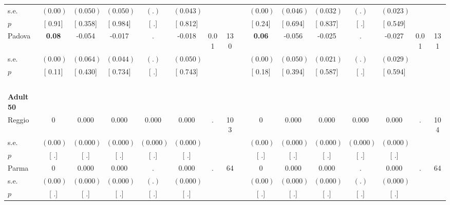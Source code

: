 \begin{longtable}{L{8em} c c c c c c c p{1em} c c c c c c c}
\quad \quad \quad \quad s.e.& $ (     0.00)$ & $ (    0.050)$ & $ (    0.050)$ & $ (        .)$ & $ (    0.043)$ & & & & $ (     0.00)$ & $ (    0.046)$ & $ (    0.032)$ & $ (        .)$ & $ (    0.023)$ & &  \\*
\quad \quad \quad \quad $ p$ & [     0.91] & [    0.358] & [    0.984] & [        .] & [    0.812] & & & & [     0.24] & [    0.694] & [    0.837] & [        .] & [    0.549] & &  \\[1em]
\quad \quad \quad Padova& \textbf{     0.08} &    -0.054 &    -0.017 &         . &    -0.018 &      0.01 &       130 & & \textbf{     0.06} &    -0.056 &    -0.025 &         . &    -0.027 &      0.01 &       131  \\*
\quad \quad \quad \quad s.e.& $ (     0.00)$ & $ (    0.064)$ & $ (    0.044)$ & $ (        .)$ & $ (    0.050)$ & & & & $ (     0.00)$ & $ (    0.050)$ & $ (    0.021)$ & $ (        .)$ & $ (    0.029)$ & &  \\*
\quad \quad \quad \quad $ p$ & [     0.11] & [    0.430] & [    0.734] & [        .] & [    0.743] & & & & [     0.18] & [    0.394] & [    0.587] & [        .] & [    0.594] & &  \\[1em]
~\\[1em]
\quad \quad \textbf{Adult 50} & & & & & & & & & & & & & & & \\* 
\quad \quad \quad Reggio& 0 &     0.000 &     0.000 &     0.000 &     0.000 &         . &       103 & & 0 &     0.000 &     0.000 &     0.000 &     0.000 &         . &       104  \\*
\quad \quad \quad \quad s.e.& $ (     0.00)$ & $ (    0.000)$ & $ (    0.000)$ & $ (    0.000)$ & $ (    0.000)$ & & & & $ (     0.00)$ & $ (    0.000)$ & $ (    0.000)$ & $ (    0.000)$ & $ (    0.000)$ & &  \\*
\quad \quad \quad \quad $ p$ & [        .] & [        .] & [        .] & [        .] & [        .] & & & & [        .] & [        .] & [        .] & [        .] & [        .] & &  \\[1em]
\quad \quad \quad Parma& 0 &     0.000 &     0.000 &         . &     0.000 &         . &        64 & & 0 &     0.000 &     0.000 &         . &     0.000 &         . &        64  \\*
\quad \quad \quad \quad s.e.& $ (     0.00)$ & $ (    0.000)$ & $ (    0.000)$ & $ (        .)$ & $ (    0.000)$ & & & & $ (     0.00)$ & $ (    0.000)$ & $ (    0.000)$ & $ (        .)$ & $ (    0.000)$ & &  \\*
\quad \quad \quad \quad $ p$ & [        .] & [        .] & [        .] & [        .] & [        .] & & & & [        .] & [        .] & [        .] & [        .] & [        .] & &  \\[1em]

\end{longtable}
